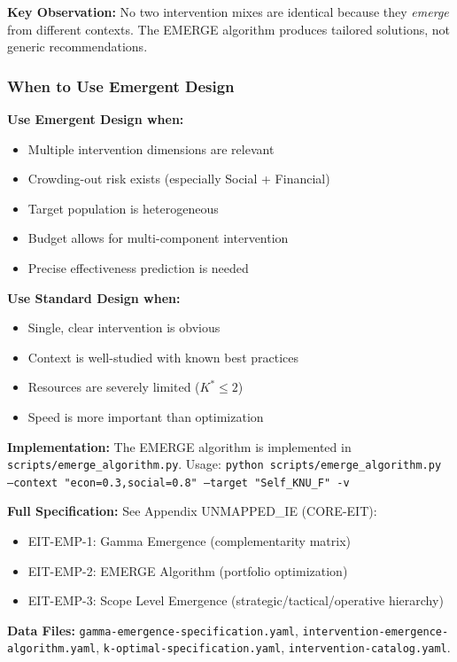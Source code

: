 \textbf{Key Observation:} No two intervention mixes are identical because they \emph{emerge} from different contexts. The EMERGE algorithm produces tailored solutions, not generic recommendations.

\subsubsection{When to Use Emergent Design}
\label{subsubsec:when-to-use}

\begin{tcolorbox}[colback=yellow!5!white, colframe=yellow!75!black,
    title=\textbf{Decision Framework: Emergent vs. Standard Design}]

\textbf{Use Emergent Design when:}
\begin{itemize}[nosep]
    \item Multiple intervention dimensions are relevant
    \item Crowding-out risk exists (especially Social + Financial)
    \item Target population is heterogeneous
    \item Budget allows for multi-component intervention
    \item Precise effectiveness prediction is needed
\end{itemize}

\textbf{Use Standard Design when:}
\begin{itemize}[nosep]
    \item Single, clear intervention is obvious
    \item Context is well-studied with known best practices
    \item Resources are severely limited ($K^* \leq 2$)
    \item Speed is more important than optimization
\end{itemize}

\end{tcolorbox}

\begin{cross-reference}
\textbf{Implementation:} The EMERGE algorithm is implemented in \texttt{scripts/emerge\_algorithm.py}. Usage: \texttt{python scripts/emerge\_algorithm.py --context "econ=0.3,social=0.8" --target "Self\_KNU\_F" -v}

\textbf{Full Specification:} See Appendix UNMAPPED_IE (CORE-EIT):
\begin{itemize}[nosep]
    \item EIT-EMP-1: Gamma Emergence (complementarity matrix)
    \item EIT-EMP-2: EMERGE Algorithm (portfolio optimization)
    \item EIT-EMP-3: Scope Level Emergence (strategic/tactical/operative hierarchy)
\end{itemize}

\textbf{Data Files:} \texttt{gamma-emergence-specification.yaml}, \texttt{intervention-emergence-algorithm.yaml}, \texttt{k-optimal-specification.yaml}, \texttt{intervention-catalog.yaml}.
\end{cross-reference}

